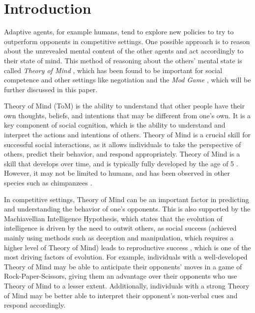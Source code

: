 \section{Introduction}\label{sec:introduction}

Adaptive agents, for example humans, tend to explore new policies to try to outperform opponents in competitive settings. One possible approach is to reason about the unrevealed mental content of the other agents and act accordingly to their state of mind. This method of reasoning about the others' mental state is called \textit{Theory of Mind} \citep{premack1978does}, which has been found to be important for social competence \citep{liddle2006higher} and other settings like negotiation \citep{de2017negotiating} and the \textit{Mod Game} \citep{veltman2019training}, which will be further discussed in this paper.

Theory of Mind (ToM) is the ability to understand that other people have their own thoughts, beliefs, and intentions that may be different from one's own. It is a key component of social cognition, which is the ability to understand and interpret the actions and intentions of others. Theory of Mind is a crucial skill for successful social interactions, as it allows individuals to take the perspective of others, predict their behavior, and respond appropriately. Theory of Mind is a skill that develops over time, and is typically fully developed by the age of 5 \citep{call2008does}. However, it may not be limited to humans, and has been observed in other species such as chimpanzees \citep{premack1978does}.

In competitive settings, Theory of Mind can be an important factor in predicting and understanding the behavior of one's opponents. This is also supported by the Machiavellian Intelligence Hypothesis, which states that the evolution of intelligence is driven by the need to outwit others, as social success (achieved mainly using methods such as deception and manipulation, which requires a higher level of Theory of Mind) leads to reproductive success \citep{gavrilets2006dynamics}, which is one of the most driving factors of evolution. For example, individuals with a well-developed Theory of Mind may be able to anticipate their opponents' moves in a game of Rock-Paper-Scissors, giving them an advantage over their opponents who use Theory of Mind to a lesser extent\citep{de2013much}. Additionally, individuals with a strong Theory of Mind may be better able to interpret their opponent's non-verbal cues and respond accordingly. 

